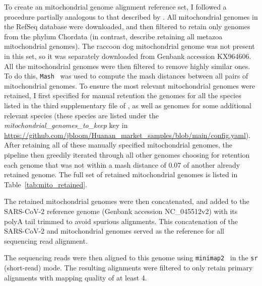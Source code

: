 \documentclass[9pt,twocolumn,twoside]{gsajnl_modified}
\begin{document}
{To create an mitochondrial genome alignment reference set, I followed a procedure partially analogous to that described by \citet{crits2023genetic}.
All mitochondrial genomes in the RefSeq database were downloaded, and then filtered to retain only genomes from the phylum Chordata (in contrast, \citet{crits2023genetic} describe retaining all metazoa mitochondrial genomes).
The raccoon dog mitochondrial genome was not present in this set, so it was separately downloaded from Genbank accession KX964606.
All the mitochondrial genomes were then filtered to remove highly similar ones.
To do this, \texttt{Mash}~\citep{ondov2016mash} was used to compute the mash distances between all pairs of mitochondrial genomes.
To ensure the most relevant mitochondrial genomes were retained, I first specified for manual retention the genomes for all the species listed in the third supplementary file of \citet{crits2023genetic}, as well as genomes for some additional relevant species (these species are listed under the \textit{mitochondrial\_genomes\_to\_keep} key in \url{https://github.com/jbloom/Huanan_market_samples/blob/main/config.yaml}).
After retaining all of these manually specified mitochondrial genomes, the pipeline then greedily iterated through all other genomes choosing for retention each genome that was not within a mash distance of 0.07 of another already retained genome.
The full set of retained mitochondrial genomes is listed in Table~\ref{tab:mito_retained}.

The retained mitochondrial genomes were then concatenated, and added to the SARS-CoV-2 reference genome (Genbank accession NC\_045512v2) with its polyA tail trimmed to avoid spurious alignments.
This concatenation of the SARS-CoV-2 and mitochondrial genomes served as the reference for all sequencing read alignment.

The sequencing reads were then aligned to this genome using \texttt{minimap2}~\citep{li2018minimap2} in the \texttt{sr} (short-read) mode.
The resulting alignments were filtered to only retain primary alignments with mapping quality of at least 4.

}
\end{document}
